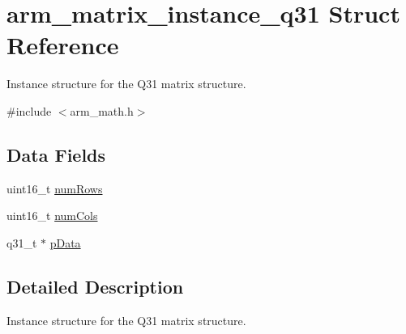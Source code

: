 \hypertarget{structarm__matrix__instance__q31}{\section{arm\-\_\-matrix\-\_\-instance\-\_\-q31 Struct Reference}
\label{structarm__matrix__instance__q31}
}


Instance structure for the Q31 matrix structure.  




{\ttfamily \#include $<$arm\-\_\-math.\-h$>$}

\subsection*{Data Fields}
\begin{DoxyCompactItemize}
\item 
uint16\-\_\-t \hyperlink{structarm__matrix__instance__q31_a1bcf80ccdc2acc29198f1592ae300390}{num\-Rows}
\item 
uint16\-\_\-t \hyperlink{structarm__matrix__instance__q31_a4bb5ec0d13eb4c9cf887aa8366a44117}{num\-Cols}
\item 
q31\-\_\-t $\ast$ \hyperlink{structarm__matrix__instance__q31_ad296f76577326ff280726323536eed6d}{p\-Data}
\end{DoxyCompactItemize}


\subsection{Detailed Description}
Instance structure for the Q31 matrix structure. 

